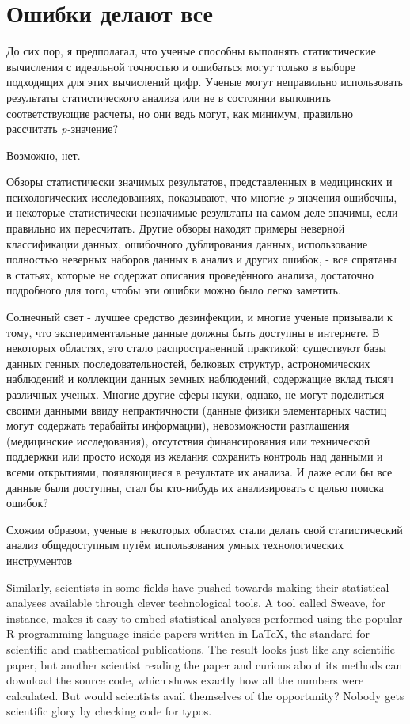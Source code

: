 \chapter{Ошибки делают все}
\label{chp9}

До сих пор, я предполагал, что ученые способны выполнять статистические вычисления с идеальной точностью и ошибаться могут только в выборе подходящих для этих вычислений цифр. Ученые могут неправильно использовать результаты статистического анализа или не в состоянии выполнить соответствующие расчеты, но они ведь могут, как минимум, правильно рассчитать \emph{p-}значение?

Возможно, нет. 

Обзоры статистически значимых результатов, представленных в медицинских и психологических исследованиях, показывают, что многие \emph{p-}значения ошибочны, и некоторые статистически незначимые результаты на самом деле значимы, если правильно их пересчитать. \cite{gotzsche_believability_2006,bakker_misreporting_2011} Другие обзоры находят примеры неверной классификации данных, ошибочного дублирования данных, использование полностью неверных наборов данных в анализ и других ошибок, - все спрятаны в статьях, которые не содержат описания проведённого анализа, достаточно подробного для того, чтобы эти ошибки можно было легко заметить. \cite{baggerly_deriving_2009,gotzsche_methodology_1989} 

Солнечный свет - лучшее средство дезинфекции, и многие ученые призывали к тому, что экспериментальные данные должны быть доступны в интернете. В некоторых областях, это стало распространенной практикой: существуют базы данных генных последовательностей, белковых структур, астрономических наблюдений и коллекции данных земных наблюдений, содержащие вклад тысяч различных ученых. Многие другие сферы науки, однако, не могут поделиться своими данными ввиду непрактичности (данные физики элементарных частиц могут содержать терабайты информации), невозможности разглашения (медицинские исследования), отсутствия финансирования или технической поддержки или просто исходя из желания сохранить контроль над данными и всеми открытиями, появляющиеся в результате их анализа. И даже если бы все данные были доступны, стал бы кто-нибудь их анализировать с целью поиска ошибок?   

Схожим образом, ученые в некоторых областях стали делать свой статистический анализ общедоступным путём использования умных технологических инструментов

Similarly, scientists in some fields have pushed towards making their statistical analyses available through clever technological tools. A tool called Sweave, for instance, makes it easy to embed statistical analyses performed using the popular R programming language inside papers written in LaTeX, the standard for scientific and mathematical publications. The result looks just like any scientific paper, but another scientist reading the paper and curious about its methods can download the source code, which shows exactly how all the numbers were calculated. But would scientists avail themselves of the opportunity? Nobody gets scientific glory by checking code for typos.


